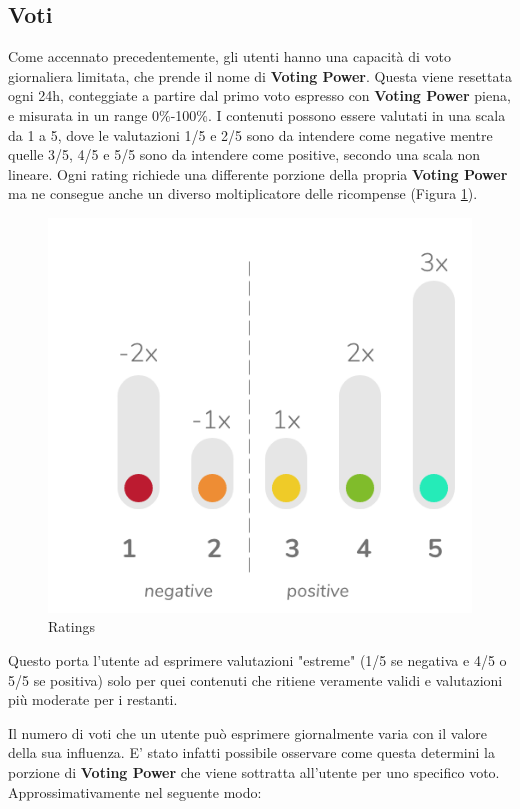 \subsection{Voti}
\label{voti_section}
Come accennato precedentemente, gli utenti hanno una capacità di voto giornaliera limitata, che prende il nome di \textbf{Voting Power}. Questa viene resettata ogni 24h, conteggiate a partire dal primo voto espresso con \textbf{Voting Power} piena, e misurata in un range 0\%-100\%. 
I contenuti possono essere valutati in una scala da 1 a 5, dove le valutazioni 1/5 e 2/5 sono da intendere come negative mentre quelle 3/5, 4/5 e 5/5 sono da intendere come positive, secondo una scala non lineare. Ogni rating richiede una differente porzione della propria \textbf{Voting Power} ma ne consegue anche un diverso moltiplicatore delle ricompense (Figura \ref{fig:ratings}).
\begin{figure}[t]
    \centering
    \includegraphics[scale=0.5]{images/ratings.png}
    \caption{Ratings}
    \label{fig:ratings}
\end{figure}
Questo porta l'utente ad esprimere valutazioni "estreme" (1/5 se negativa e 4/5 o 5/5 se positiva) solo per quei contenuti che ritiene veramente validi e valutazioni più moderate per i restanti.

Il numero di voti che un utente può esprimere giornalmente varia con il valore della sua influenza. E' stato infatti possibile osservare come questa determini la porzione di \textbf{Voting Power} che viene sottratta all'utente per uno specifico voto. Approssimativamente nel seguente modo:

